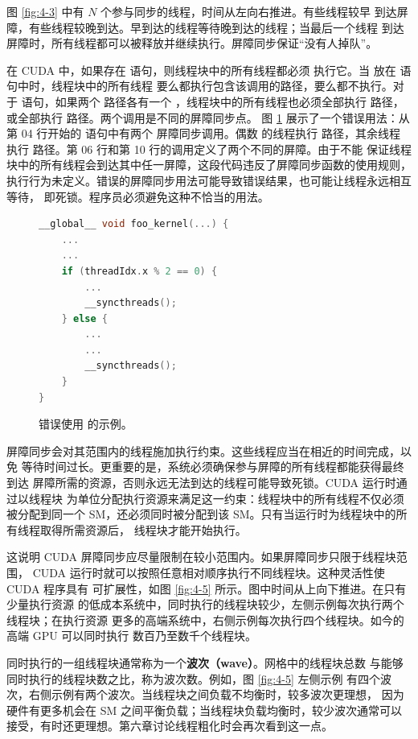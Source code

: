 图 \ref{fig:4-3} 中有 $N$ 个参与同步的线程，时间从左向右推进。有些线程较早
到达屏障，有些线程较晚到达。早到达的线程等待晚到达的线程；当最后一个线程
到达屏障时，所有线程都可以被释放并继续执行。屏障同步保证“没有人掉队”。

在 CUDA 中，如果存在  语句，则线程块中的所有线程都必须
执行它。当  放在  语句中时，线程块中的所有线程
要么都执行包含该调用的路径，要么都不执行。对于  语句，如果两个
路径各有一个 ，线程块中的所有线程也必须全部执行
 路径，或全部执行  路径。两个调用是不同的屏障同步点。
图 \ref{fig:4-4} 展示了一个错误用法：从第 04 行开始的  语句中有两个
屏障同步调用。偶数  的线程执行  路径，其余线程
执行  路径。第 06 行和第 10 行的调用定义了两个不同的屏障。由于不能
保证线程块中的所有线程会到达其中任一屏障，这段代码违反了屏障同步函数的使用规则，
执行行为未定义。错误的屏障同步用法可能导致错误结果，也可能让线程永远相互等待，
即死锁。程序员必须避免这种不恰当的用法。

\begin{figure}[htbp]
  \centering
  \begin{lstlisting}[language=C++,firstnumber=1]
__global__ void foo_kernel(...) {
    ...
    ...
    if (threadIdx.x % 2 == 0) {
        ...
        __syncthreads();
    } else {
        ...
        ...
        __syncthreads();
    }
}
  \end{lstlisting}
  \caption{错误使用  的示例。}
  \label{fig:4-4}
\end{figure}

屏障同步会对其范围内的线程施加执行约束。这些线程应当在相近的时间完成，以免
等待时间过长。更重要的是，系统必须确保参与屏障的所有线程都能获得最终到达
屏障所需的资源，否则永远无法到达的线程可能导致死锁。CUDA 运行时通过以线程块
为单位分配执行资源来满足这一约束：线程块中的所有线程不仅必须被分配到同一个
SM，还必须同时被分配到该 SM。只有当运行时为线程块中的所有线程取得所需资源后，
线程块才能开始执行。

这说明 CUDA 屏障同步应尽量限制在较小范围内。如果屏障同步只限于线程块范围，
CUDA 运行时就可以按照任意相对顺序执行不同线程块。这种灵活性使 CUDA 程序具有
可扩展性，如图 \ref{fig:4-5} 所示。图中时间从上向下推进。在只有少量执行资源
的低成本系统中，同时执行的线程块较少，左侧示例每次执行两个线程块；在执行资源
更多的高端系统中，右侧示例每次执行四个线程块。如今的高端 GPU 可以同时执行
数百乃至数千个线程块。

同时执行的一组线程块通常称为一个\textbf{波次（wave）}。网格中的线程块总数
与能够同时执行的线程块数之比，称为波次数。例如，图 \ref{fig:4-5} 左侧示例
有四个波次，右侧示例有两个波次。当线程块之间负载不均衡时，较多波次更理想，
因为硬件有更多机会在 SM 之间平衡负载；当线程块负载均衡时，较少波次通常可以
接受，有时还更理想。第六章讨论线程粗化时会再次看到这一点。


